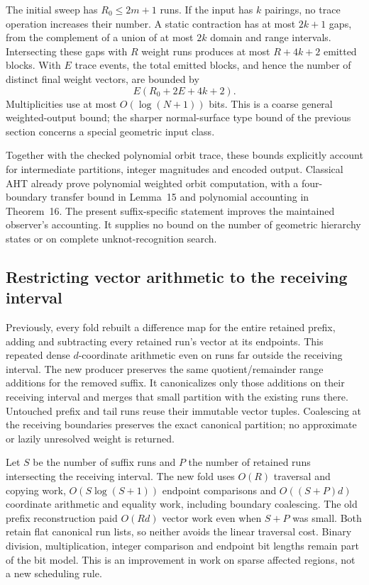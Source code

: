 The initial sweep has $R_0\le2m+1$ runs. If the input has $k$ pairings,
no trace operation increases their number. A static contraction has at most
$2k+1$ gaps, from the complement of a union of at most $2k$ domain and range
intervals. Intersecting these gaps with $R$ weight runs produces at most
$R+4k+2$ emitted blocks. With $E$ trace events, the total emitted blocks,
and hence the number of distinct final weight vectors, are bounded by
\[
             E(R_0+2E+4k+2).
\]
Multiplicities use at most $O(\log(N+1))$ bits. This is a coarse general
weighted-output bound; the sharper normal-surface type bound of the previous
section concerns a special geometric input class.

Together with the checked polynomial orbit trace, these bounds explicitly
account for intermediate partitions, integer magnitudes and encoded output.
Classical AHT already prove polynomial weighted orbit computation, with a
four-boundary transfer bound in Lemma~15 and polynomial accounting in
Theorem~16\cite{aht-orbits}. The present suffix-specific statement improves
the maintained observer's accounting. It supplies no bound on the number
of geometric hierarchy states or on complete unknot-recognition search.

\subsection{Restricting vector arithmetic to the receiving interval}

Previously, every fold rebuilt a difference map for the entire retained
prefix, adding and subtracting every retained run's vector at its endpoints.
This repeated dense $d$-coordinate arithmetic even on runs far outside the
receiving interval. The new producer preserves the same quotient/remainder
range additions for the removed suffix. It canonicalizes only those additions
on their receiving interval and merges that small partition with the existing
runs there. Untouched prefix and tail runs reuse their immutable vector
tuples. Coalescing at the receiving boundaries preserves the exact canonical
partition; no approximate or lazily unresolved weight is returned.

Let $S$ be the number of suffix runs and $P$ the number of retained runs
intersecting the receiving interval. The new fold uses $O(R)$ traversal
and copying work, $O(S\log(S+1))$ endpoint comparisons and
$O((S+P)d)$ coordinate arithmetic and equality work, including boundary
coalescing. The old prefix reconstruction paid $O(Rd)$ vector work even
when $S+P$ was small. Both retain flat canonical run lists, so neither
avoids the linear traversal cost. Binary division, multiplication, integer
comparison and endpoint bit lengths remain part of the bit model. This is
an improvement in work on sparse affected regions, not a new scheduling rule.

